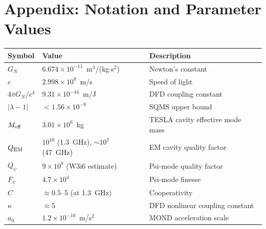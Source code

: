 \documentclass[11pt]{article}
\newcommand{\ee}[1]{\times 10^{#1}}
\newcommand{\Meff}{M_{\rm eff}}
\newcommand{\lambdaone}{|\lambda{-}1|}
\newcommand{\Qpsi}{Q_\psi}
\newcommand{\QEM}{Q_{\rm EM}}
\newcommand{\GN}{G_N}
\newcommand{\Fpsi}{F_\psi}
\begin{document}
\section*{Appendix: Notation and Parameter Values}

\begin{center}
\begin{tabular}{lll}
\toprule
Symbol & Value & Description \\
\midrule
$\GN$ & $6.674\ee{-11}$~m$^3$/(kg$\cdot$s$^2$) & Newton's constant \\
$c$ & $2.998\ee{8}$~m/s & Speed of light \\
$4\pi\GN/c^4$ & $9.31\ee{-44}$~m/J & DFD coupling constant \\
$\lambdaone$ & $<1.56\ee{-9}$ & SQMS upper bound \\
$\Meff$ & $3.01\ee{6}$~kg & TESLA cavity effective mode mass \\
$\QEM$ & $10^{10}$ (1.3~GHz), $\sim 10^7$ (47~GHz) & EM cavity quality factor \\
$\Qpsi$ & $9\ee{8}$ (W3i6 estimate) & Psi-mode quality factor \\
$\Fpsi$ & $4.7\ee{4}$ & Psi-mode finesse \\
$C$ & $\approx 0.5$--5 (at 1.3~GHz) & Cooperativity \\
$\kappa$ & $\approx 5$ & DFD nonlinear coupling constant \\
$a_0$ & $1.2\ee{-10}$~m/s$^2$ & MOND acceleration scale \\
\bottomrule
\end{tabular}
\end{center}
\end{document}
